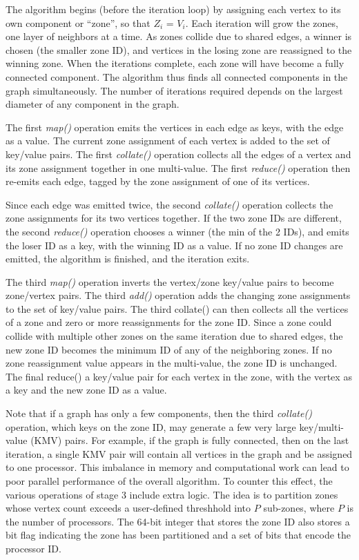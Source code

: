 The algorithm begins (before the iteration loop) by assigning each
vertex to its own component or ``zone'', so that $Z_i$ = $V_i$.  Each
iteration will grow the zones, one layer of neighbors at a time.  As
zones collide due to shared edges, a winner is chosen (the smaller
zone ID), and vertices in the losing zone are reassigned to the
winning zone.  When the iterations complete, each zone will have
become a fully connected component.  The algorithm thus finds all
connected components in the graph simultaneously.  The number of
iterations required depends on the largest diameter of any component
in the graph.

The first {\it map()} operation emits the vertices in each edge as
keys, with the edge as a value.  The current zone assignment of each
vertex is added to the set of key/value pairs.  The first {\it
collate()} operation collects all the edges of a vertex and its zone
assignment together in one multi-value.  The first {\it reduce()}
operation then re-emits each edge, tagged by the zone assignment of
one of its vertices.

Since each edge was emitted twice, the second {\it collate()}
operation collects the zone assignments for its two vertices together.
If the two zone IDs are different, the second {\it reduce()} operation
chooses a winner (the min of the 2 IDs), and emits the loser ID as a
key, with the winning ID as a value.  If no zone ID changes are
emitted, the algorithm is finished, and the iteration exits.

The third {\it map()} operation inverts the vertex/zone key/value
pairs to become zone/vertex pairs.  The third {\it add()} operation
adds the changing zone assignments to the set of key/value pairs.  The
third collate() can then collects all the vertices of a zone and zero
or more reassignments for the zone ID.  Since a zone could collide
with multiple other zones on the same iteration due to shared edges,
the new zone ID becomes the minimum ID of any of the neighboring
zones.  If no zone reassignment value appears in the multi-value, the
zone ID is unchanged.  The final reduce() a key/value pair for each
vertex in the zone, with the vertex as a key and the new zone ID as a
value.

Note that if a graph has only a few components, then the third {\it
collate()} operation, which keys on the zone ID, may generate a few
very large key/multi-value (KMV) pairs.  For example, if the graph is
fully connected, then on the last iteration, a single KMV pair will
contain all vertices in the graph and be assigned to one processor.
This imbalance in memory and computational work can lead to poor
parallel performance of the overall algorithm.  To counter this
effect, the various operations of stage 3 include extra logic.  The
idea is to partition zones whose vertex count exceeds a user-defined
threshhold into $P$ sub-zones, where $P$ is the number of processors.
The 64-bit integer that stores the zone ID also stores a bit flag
indicating the zone has been partitioned and a set of bits that encode
the processor ID.

